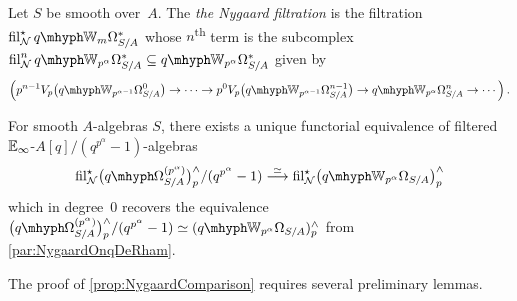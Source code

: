 \documentclass[DIV=12,numbers=enddot,leqno,bibliography=totoc]{scrartcl}
\begin{document}
	
	\begin{numpar}\label{def:NygaardFiltration}
		Let $S$ be smooth over~$A$. The \emph{the Nygaard filtration} is the filtration $ \fil_\Nn^\star \qIW_m\Omega_{S/A}^*$ whose $n$\textsuperscript{th} term is the subcomplex $ \fil_\Nn^n\qIW_{p^\alpha}\Omega_{S/A}^*\subseteq \qIW_{p^\alpha}\Omega_{S/A}^*$ given by
		\begin{equation*}
			\left(p^{n-1}V_p\bigl(\qIW_{p^{\alpha-1}}\Omega_{S/A}^0\bigr) \rightarrow\dotsb\rightarrow p^0V_p\bigl(\qIW_{p^{\alpha-1}}\Omega_{S/A}^{n-1}\bigr)\rightarrow \qIW_{p^{\alpha}}\Omega_{S/A}^n\rightarrow\dotsb\right)\,.
		\end{equation*}
	\end{numpar}
	\begin{prop}\label{prop:NygaardComparison}
		For smooth $A$-algebras $S$, there exists a unique functorial equivalence of filtered $\mathbb{E}_\infty$-$A[q]/(q^{p^\alpha}-1)$-algebras
		\begin{equation*}
			\fil_\Nn^\star \bigl(\qOmega_{S/A}^{(p^\alpha)}\bigr)_p^\complete/(q^{p^\alpha}-1)\overset{\simeq}{\longrightarrow} \fil_\Nn^\star \left(\qIW_{p^\alpha}\Omega_{S/A}\right)_p^\complete
		\end{equation*}
		 which in degree~$0$ recovers the equivalence $\bigl(\qOmega_{S/A}^{(p^\alpha)}\bigr)_p^\complete/(q^{p^\alpha}-1)\simeq (\qIW_{p^\alpha}\Omega_{S/A})_p^\complete$ from \cref{par:NygaardOnqDeRham}.
	\end{prop}
	
	The proof of \cref{prop:NygaardComparison} requires several preliminary lemmas.
	
\end{document}
